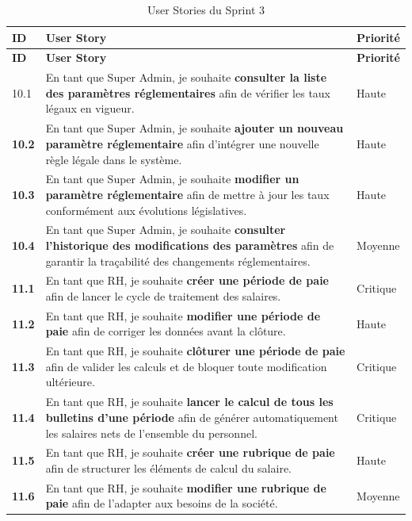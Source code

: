 \begin{small}
\renewcommand{\arraystretch}{1.4}
\begin{longtable}{|>{\bfseries}p{1.2cm}|p{9.5cm}|>{\centering\arraybackslash}p{2.5cm}|}
\hline
\rowcolor[gray]{0.9} \textbf{ID} & \textbf{User Story} & \textbf{Priorité} \\ \hline
\endfirsthead
\hline
\rowcolor[gray]{0.9} \textbf{ID} & \textbf{User Story} & \textbf{Priorité} \\ \hline
\endhead
\hline
\endfoot
\hline
\caption{User Stories du Sprint 3 }
\label{tab:us-sprint3}
\endlastfoot

10.1 & En tant que Super Admin, je souhaite \textbf{consulter la liste des paramètres réglementaires} afin de vérifier les taux légaux en vigueur. & Haute \\ \hline
10.2 & En tant que Super Admin, je souhaite \textbf{ajouter un nouveau paramètre réglementaire} afin d'intégrer une nouvelle règle légale dans le système. & Haute \\ \hline
10.3 & En tant que Super Admin, je souhaite \textbf{modifier un paramètre réglementaire} afin de mettre à jour les taux conformément aux évolutions législatives. & Haute \\ \hline
10.4 & En tant que Super Admin, je souhaite \textbf{consulter l'historique des modifications des paramètres} afin de garantir la traçabilité des changements réglementaires. & Moyenne \\ \hline
11.1 & En tant que RH, je souhaite \textbf{créer une période de paie} afin de lancer le cycle de traitement des salaires. & Critique \\ \hline
11.2 & En tant que RH, je souhaite \textbf{modifier une période de paie} afin de corriger les données avant la clôture. & Haute \\ \hline
11.3 & En tant que RH, je souhaite \textbf{clôturer une période de paie} afin de valider les calculs et de bloquer toute modification ultérieure. & Critique \\ \hline
11.4 & En tant que RH, je souhaite \textbf{lancer le calcul de tous les bulletins d'une période} afin de générer automatiquement les salaires nets de l'ensemble du personnel. & Critique \\ \hline
11.5 & En tant que RH, je souhaite \textbf{créer une rubrique de paie} afin de structurer les éléments de calcul du salaire. & Haute \\ \hline
11.6 & En tant que RH, je souhaite \textbf{modifier une rubrique de paie} afin de l'adapter aux besoins de la société. & Moyenne \\ \hline

\end{longtable}
\end{small}
